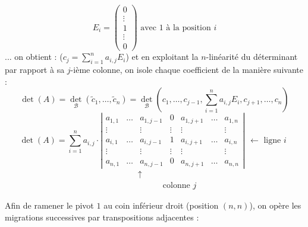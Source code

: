 \documentclass[11pt, a4paper]{article}
\theoremstyle{definition}
\begin{document}
$$E_i = \left(\begin{matrix} 0 \\ \vdots \\ 1 \\ \vdots \\ 0 \end{matrix}\right) \text{ avec } 1 \text{ à la position } i$$
... on obtient : ($c_j = \sum_{i=1}^n a_{i,j} E_i$) et en exploitant la $n$-linéarité du déterminant par rapport à sa $j$-ième colonne, on isole chaque coefficient de la manière suivante :
$$\det(A) = \det_\mathcal{B}(\tilde c_1, \dots, \tilde c_n) = \det_\mathcal{B}(c_1, \dots, c_{j-1}, \sum_{i=1}^n a_{i,j} E_i, c_{j+1}, \dots, c_n)$$
$$\det(A) = \sum_{i=1}^n a_{i,j} \cdot \left|\begin{matrix} 
	a_{1,1} & \dots & a_{1,j-1} & 0 & a_{1,j+1} & \dots & a_{1,n} \\
	\vdots & & \vdots & \vdots & \vdots & & \vdots \\
	a_{i,1} & \dots & a_{i,j-1} & 1 & a_{i,j+1} & \dots & a_{i,n} \\
	\vdots & & \vdots & \vdots & \vdots & & \vdots \\
	a_{n,1} & \dots & a_{n,j-1} & 0 & a_{n,j+1} & \dots & a_{n,n}
\end{matrix}\right| \begin{matrix} \ \\ \ \\ \leftarrow \text{ ligne } i \\ \ \\ \ \end{matrix}$$
$$\begin{matrix} \qquad \quad \uparrow \\ \qquad \qquad \qquad \text{colonne } j \end{matrix}$$

Afin de ramener le pivot $1$ au coin inférieur droit (position $(n,n)$), on opère les migrations successives par transpositions adjacentes :
\end{document}
